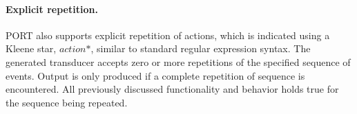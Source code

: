 \paragraph{Explicit repetition.}
PORT also supports explicit repetition of actions, which is indicated using a Kleene star, $\mathit{action}\texttt{*}$, similar to standard regular expression syntax.
The generated transducer accepts zero or more repetitions of the specified sequence of events.
Output is only produced if a complete repetition of sequence is encountered.
All previously discussed functionality and behavior holds true for the sequence being repeated.


